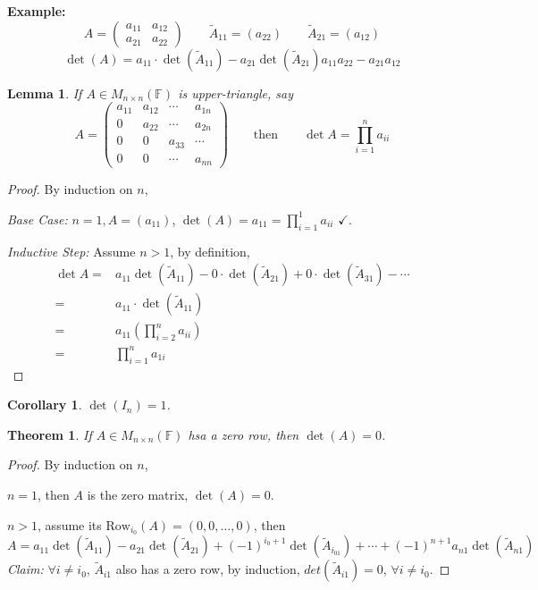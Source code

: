 \documentclass[12pt]{article}
\newtheorem{theorem}{Theorem}[subsection]
\newtheorem{lemma}{Lemma}[subsection]
\newtheorem{corollary}{Corollary}[subsection]
\newcommand{\Row}{\mathrm{Row}}
\newcommand{\mF}{{\mathbb{F}}}
\begin{document}
{\color{Brown}
\textbf{Example:}
\[
	A = 
	\begin{pmatrix}
		a_{11} & a_{12}	\\
		a_{21} & a_{22}	
	\end{pmatrix}
	\qquad 
	\tilde A_{11} = (a_{22}) 
	\qquad 
	\tilde A_{21} = (a_{12})
\]
\[
	\det(A) = a_{11} \cdot \det(\tilde A_{11}) - a_{21} \det(\tilde A_{21})
	a_{11} a_{22} - a_{21} a_{12} 
\]
}

\begin{lemma}
	If $A \in M_{n\times n}(\mF)$ is upper-triangle, say
	\[
		A = 
		\begin{pmatrix}
			a_{11} & a_{12} & \cdots & a_{1n}	\\
			0	   & a_{22} & \cdots & a_{2n}	\\
			0	   & 0		& a_{33} & \cdots	\\
			0	   & 0		& \cdots & a_{nn}
		\end{pmatrix}
		\qquad 
		\text{then}
		\qquad 
		\det A = \prod_{i=1}^n a_{ii}
	\]
\end{lemma}
\begin{proof}
	By induction on $n$, 
	
	\textit{Base Case: } $n=1, A = (a_{11})$, $\det(A) = a_{11} = \prod_{i=1}^1
	a_{ii}$ $\checkmark$. 

	\textit{Inductive Step:} Assume $n > 1$, by definition, 
	\begin{align*}
		\det A =& a_{11} \det (\tilde A_{11}) - 0 \cdot \det(\tilde A_{21})
		+ 0\cdot \det(\tilde A_{31})- \cdots	\\
		=& a_{11} \cdot \det(\tilde A_{11})	\\
		=& a_{11} (\prod_{i=2}^n a_{ii}) \tag{by IH}	\\
		=& \prod_{i=1}^n a_{1i}
	\end{align*}
\end{proof}

\begin{corollary}
	$\det(I_n) = 1$.	\\
\end{corollary}

\begin{theorem}
	If $A \in M_{n\times n}(\mF)$ hsa a zero row, then $\det(A) = 0$.
\end{theorem}
\begin{proof}
	By induction on $n$, 
	
	$n = 1$, then $A$ is the zero matrix, $\det(A) = 0$. 

	$n > 1$, assume its $\Row_{i_0} (A) = (0, 0, \ldots, 0)$, then
	\[
		A = a_{11} \det(\tilde A_{11}) - a_{21} \det(\tilde A_{21})
		+(-1)^{i_0+1}\det(\tilde A_{i_01}) + \cdots + (-1)^{n+1}a_{n1} 
		\det(\tilde A_{n1}) 
	\]
	\textit{Claim:} $\forall i \neq i_0$, $\tilde A_{i1}$ also has a zero row,
	by induction, $det(\tilde A_{i1}) = 0$, $\forall i \neq i_0$.
\end{proof}
\end{document}
